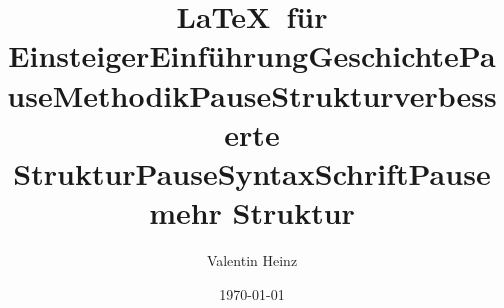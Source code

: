 \documentclass[]{beamer}
\title{\LaTeX \ für Einsteiger}
\author{Valentin Heinz}
\date{\today}
\begin{document}
\maketitle
\title{Einführung}


\title{Geschichte}


\title{Pause}


\title{Methodik}


\title{Pause}


\title{Struktur}


\title{verbesserte Struktur}


\title{Pause}


\title{Syntax}

\title{Schrift}


\title{Pause}


\title{mehr Struktur}

\end{document}
